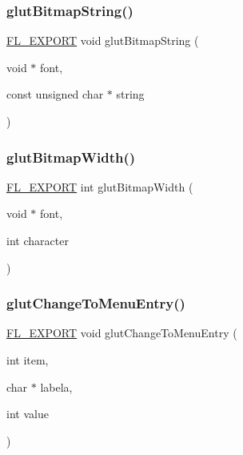 \mbox{\label{glut_8_h_a2457d8673bced8e4ad9985795451d6c6}} 
\subsubsection{\texorpdfstring{glut\+Bitmap\+String()}{glutBitmapString()}}
{\footnotesize\ttfamily \hyperlink{_fl___export_8_h_aa9ba29a18aee9d738370a06eeb4470fc}{F\+L\+\_\+\+E\+X\+P\+O\+RT} void glut\+Bitmap\+String (\begin{DoxyParamCaption}\item[{void $\ast$}]{font,  }\item[{const unsigned char $\ast$}]{string }\end{DoxyParamCaption})}

\mbox{\label{glut_8_h_af56b33c352ffbfaa7c7f5c20921802a4}} 
\subsubsection{\texorpdfstring{glut\+Bitmap\+Width()}{glutBitmapWidth()}}
{\footnotesize\ttfamily \hyperlink{_fl___export_8_h_aa9ba29a18aee9d738370a06eeb4470fc}{F\+L\+\_\+\+E\+X\+P\+O\+RT} int glut\+Bitmap\+Width (\begin{DoxyParamCaption}\item[{void $\ast$}]{font,  }\item[{int}]{character }\end{DoxyParamCaption})}

\mbox{\label{glut_8_h_a62cb703b51e26eb958e73bc22a669b3f}} 
\subsubsection{\texorpdfstring{glut\+Change\+To\+Menu\+Entry()}{glutChangeToMenuEntry()}}
{\footnotesize\ttfamily \hyperlink{_fl___export_8_h_aa9ba29a18aee9d738370a06eeb4470fc}{F\+L\+\_\+\+E\+X\+P\+O\+RT} void glut\+Change\+To\+Menu\+Entry (\begin{DoxyParamCaption}\item[{int}]{item,  }\item[{char $\ast$}]{labela,  }\item[{int}]{value }\end{DoxyParamCaption})}

